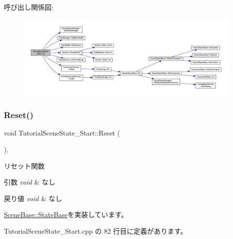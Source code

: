 呼び出し関係図\+:
\nopagebreak
\begin{figure}[H]
\begin{center}
\leavevmode
\includegraphics[width=350pt]{class_tutorial_scene_state___start_acd4cd7e4efeebffa9616d7ca31c7b1c0_cgraph}
\end{center}
\end{figure}
\mbox{\label{class_tutorial_scene_state___start_a40bfdf7acd93b619138bf708adff31e4}} 
\subsubsection{\texorpdfstring{Reset()}{Reset()}}
{\footnotesize\ttfamily void Tutorial\+Scene\+State\+\_\+\+Start\+::\+Reset (\begin{DoxyParamCaption}{ }\end{DoxyParamCaption})\hspace{0.3cm}{\ttfamily [override]}, {\ttfamily [virtual]}}



リセット関数 


\begin{DoxyParams}{引数}
{\em void} & なし \\
\hline
\end{DoxyParams}

\begin{DoxyRetVals}{戻り値}
{\em void} & なし \\
\hline
\end{DoxyRetVals}


\mbox{\hyperlink{class_scene_base_1_1_state_base_a2e14a3afece0b1d8db9edcebf514a977}{Scene\+Base\+::\+State\+Base}}を実装しています。



 Tutorial\+Scene\+State\+\_\+\+Start.\+cpp の 82 行目に定義があります。

